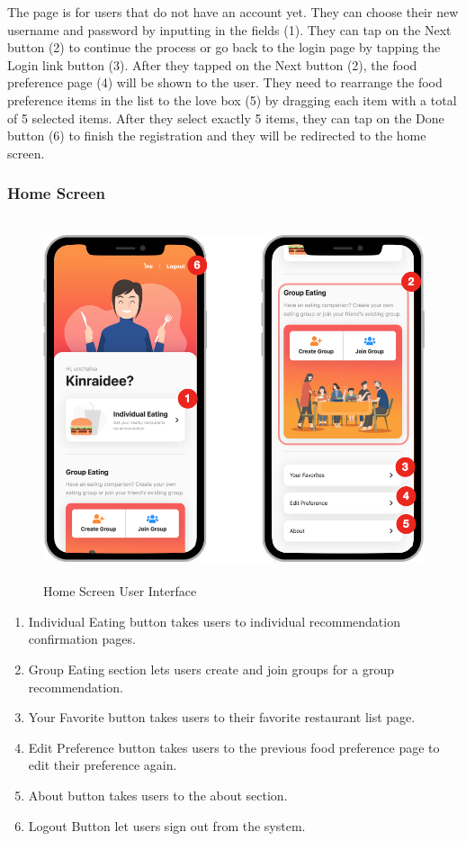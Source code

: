 \documentclass[12pt,oneside,openright,a4paper]{cpe-english-project}
\begin{document}
The page is for users that do not have an account yet. They can choose their new username and password by inputting in the fields (1). They can tap on the Next button (2) to continue the process or go back to the login page by tapping the Login link button (3). After they tapped on the Next button (2), the food preference page (4) will be shown to the user. They need to rearrange the food preference items in the list to the love box (5) by dragging each item with a total of 5 selected items. After they select exactly 5 items, they can tap on the Done button (6) to finish the registration and they will be redirected to the home screen.

\newpage
\subsubsection{Home Screen}
\begin{figure}[H]\centering
\includegraphics[height=300pt]{./images/4ui_HomeScreenUserInterface.png}
\caption{Home Screen User Interface}\label{fig:4ui_HomeScreenUserInterface}
\end{figure}

\begin{enumerate}
\item Individual Eating button takes users to individual recommendation confirmation pages.
\item Group Eating section lets users create and join groups for a group recommendation.
\item Your Favorite button takes users to their favorite restaurant list page.
\item Edit Preference button takes users to the previous food preference page to edit their preference again.
\item About button takes users to the about section.
\item Logout Button let users sign out from the system.
\end{enumerate}
\end{document}
